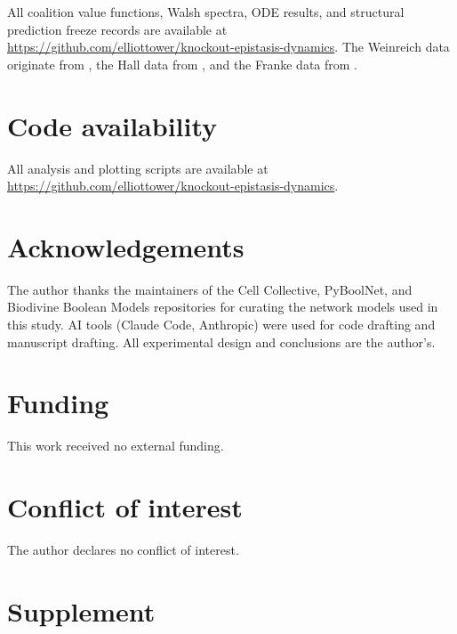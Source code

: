 \documentclass[10pt]{article}
\begin{document}
All coalition value functions, Walsh spectra, ODE results, and
structural prediction freeze records are available at
\url{https://github.com/elliottower/knockout-epistasis-dynamics}.
The Weinreich data originate from \citet{weinreich2006darwinian},
the Hall data from \citet{hall2010fitness}, and the Franke data from
\citet{franke2011evolutionary}.

\section*{Code availability}

All analysis and plotting scripts are available at
\url{https://github.com/elliottower/knockout-epistasis-dynamics}.

\section*{Acknowledgements}

The author thanks the maintainers of the Cell Collective,
PyBoolNet, and Biodivine Boolean Models repositories for curating
the network models used in this study. AI tools (Claude Code,
Anthropic) were used for code drafting and manuscript drafting.
All experimental design and conclusions are the author's.

\section*{Funding}

This work received no external funding.

\section*{Conflict of interest}

The author declares no conflict of interest.







\clearpage
\appendix
\renewcommand{\thesection}{S\arabic{section}}
\setcounter{section}{0}
\section*{Supplement}
\end{document}
